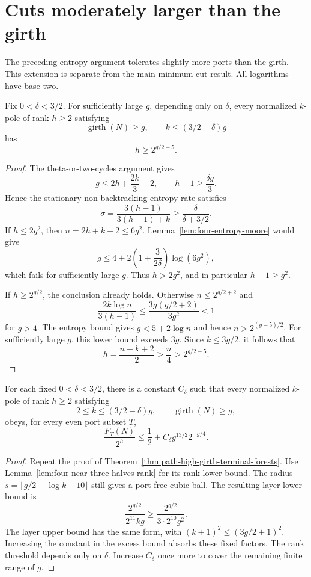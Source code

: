 \section{Cuts moderately larger than the girth}
\label{sec:four-high-connectivity-near-three-halves}

The preceding entropy argument tolerates slightly more ports than the girth.
This extension is separate from the main minimum-cut result.
All logarithms have base two.

\begin{lemma}
\label{lem:four-near-three-halves-rank}
Fix $0<\delta<3/2$.
For sufficiently large $g$, depending only on $\delta$, every normalized $k$-pole of rank $h\ge2$ satisfying
\[
 \operatorname{girth}(N)\ge g,
 \qquad k\le(3/2-\delta)g
\]
has
\[
 h\ge2^{g/2-5}.
\]
\end{lemma}

\begin{proof}
The theta-or-two-cycles argument gives
\[
 g\le2h+\frac{2k}{3}-2,
 \qquad h-1\ge\frac{\delta g}{3}.
\]
Hence the stationary non-backtracking entropy rate satisfies
\[
 \sigma=\frac{3(h-1)}{3(h-1)+k}
 \ge\frac{\delta}{\delta+3/2}.
\]
If $h\le2g^2$, then $n=2h+k-2\le6g^2$.
Lemma~\ref{lem:four-entropy-moore} would give
\[
 g\le4+2\left(1+\frac{3}{2\delta}\right)\log(6g^2),
\]
which fails for sufficiently large $g$.
Thus $h>2g^2$, and in particular $h-1\ge g^2$.

If $h\ge2^{g/2}$, the conclusion already holds.
Otherwise $n\le2^{g/2+2}$ and
\[
 \frac{2k\log n}{3(h-1)}
 \le\frac{3g(g/2+2)}{3g^2}<1
\]
for $g>4$.
The entropy bound gives $g<5+2\log n$ and hence $n>2^{(g-5)/2}$.
For sufficiently large $g$, this lower bound exceeds $3g$.
Since $k\le3g/2$, it follows that
\[
 h=\frac{n-k+2}{2}>\frac n4>2^{g/2-5}.
\]
\end{proof}

\begin{corollary}
\label{cor:four-near-three-halves-forests}
For each fixed $0<\delta<3/2$, there is a constant $C_\delta$ such that every normalized $k$-pole of rank $h\ge2$ satisfying
\[
 2\le k\le(3/2-\delta)g,
 \qquad \operatorname{girth}(N)\ge g,
\]
obeys, for every even port subset $T$,
\[
 \frac{F_T(N)}{2^h}
 \le\frac12+C_\delta g^{13/2}2^{-g/4}.
\]
\end{corollary}

\begin{proof}
Repeat the proof of Theorem~\ref{thm:path-high-girth-terminal-forests}.
Use Lemma~\ref{lem:four-near-three-halves-rank} for its rank lower bound.
The radius $s=\lfloor g/2-\log k-10\rfloor$ still gives a port-free cubic ball.
The resulting layer lower bound is
\[
 \frac{2^{g/2}}{2^{11}kg}
 \ge\frac{2^{g/2}}{3\cdot2^{10}g^2}.
\]
The layer upper bound has the same form, with $(k+1)^2\le(3g/2+1)^2$.
Increasing the constant in the excess bound absorbs these fixed factors.
The rank threshold depends only on $\delta$.
Increase $C_\delta$ once more to cover the remaining finite range of $g$.
\end{proof}

